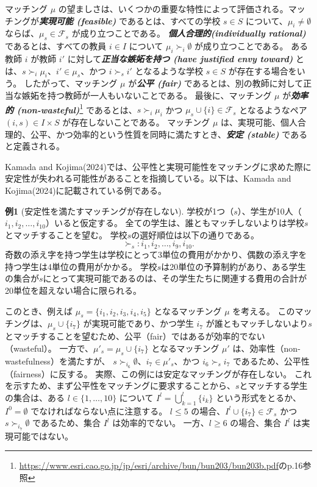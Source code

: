 \documentclass[12pt, a4paper]{article}
\theoremstyle{definition}
\theoremstyle{remark}
\theoremstyle{plain}
\begin{document}
マッチング $\mu$ の望ましさは、いくつかの重要な特性によって評価される。マッチングが\textbf{\textit{実現可能 (feasible) }}であるとは、すべての学校 $s \in S$ について、$\mu_i \neq \emptyset$ならば、$\mu_s \in \mathcal{F}_s$ が成り立つことである。
\textbf{\textit{個人合理的(individually rational) }} であるとは、すべての教員 $i \in I$ について $\mu_i \succ_i \emptyset$ が成り立つことである。
ある教師 $i$ が教師 $i'$ に対して\textbf{\textit{正当な嫉妬を持つ (have justified envy toward) }}とは、$s \succ_i \mu_i$、$i' \in \mu_s$、かつ $i \succ_s i'$ となるような学校 $s \in S$ が存在する場合をいう。
したがって、マッチング $\mu$ が\textbf{\textit{公平 (fair) }}であるとは、別の教師に対して正当な嫉妬を持つ教師が一人もいないことである。
最後に、マッチング $\mu$ が\textbf{\textit{効率的 (non-wasteful)}}\footnote{\url{https://www.esri.cao.go.jp/jp/esri/archive/bun/bun203/bun203b.pdf}のp.16参照} であるとは、$s \succ_i \mu_i$ かつ $\mu_s \cup \{i\} \in \mathcal{F}_s$ となるようなペア $(i, s) \in I \times S$ が存在しないことである。
マッチング $\mu$ は、実現可能、個人合理的、公平、かつ効率的という性質を同時に満たすとき、\textbf{\textit{安定 (stable) }}であると定義される。

Kamada and Kojima(2024)では、公平性と実現可能性をマッチングに求めた際に安定性が失われる可能性があることを指摘している。以下は、Kamada and Kojima(2024)に記載されている例である。

\textbf{例1} (安定性を満たすマッチングが存在しない). 
学校が1つ（$s$）、学生が10人（$i_1, i_2, \dots, i_{10}$）いると仮定する。
全ての学生は、誰ともマッチしないよりは学校$s$とマッチすることを望む。
学校$s$の選好順位は以下の通りである。
\[
    \succ_s: i_1, i_2, \dots, i_9, i_{10}.
\]
奇数の添え字を持つ学生は学校にとって3単位の費用がかかり、偶数の添え字を持つ学生は4単位の費用がかかる。
学校$s$は20単位の予算制約があり、ある学生の集合が$s$にとって実現可能であるのは、その学生たちに関連する費用の合計が20単位を超えない場合に限られる。

このとき、例えば $\mu_s = \{i_1, i_2, i_3, i_4, i_5\}$ となるマッチング $\mu$ を考える。
このマッチングは、$\mu_s \cup \{i_7\}$ が実現可能であり、かつ学生 $i_7$ が誰ともマッチしないより$s$とマッチすることを望むため、公平（fair）ではあるが効率的でない（wasteful）。
一方で、$\mu'_s = \mu_s \cup \{i_7\}$ となるマッチング $\mu'$ は、効率性（non-wastefulness）を満たすが、
$s \succ_{i_6} \emptyset$、$i_7 \in \mu'_s$、かつ $i_6 \succ_s i_7$ であるため、公平性（fairness）に反する。
実際、この例には安定なマッチングが存在しない。
これを示すため、まず公平性をマッチングに要求することから、$s$とマッチする学生の集合は、ある $l \in \{1, \dots, 10\}$ について $I^l = \bigcup_{k=1}^l\{i_k\}$ という形式をとるか、$I^0 = \emptyset$ でなければならない点に注意する。
$l \le 5$ の場合、$I^l \cup \{i_7\} \in \mathcal{F}_s$ かつ $s \succ_{i_7} \emptyset$ であるため、集合 $I^l$ は効率的でない。
一方、$l \ge 6$ の場合、集合 $I^l$ は実現可能ではない。
\end{document}
